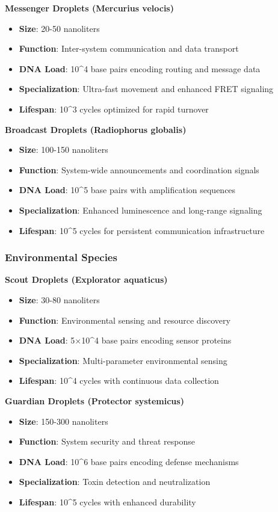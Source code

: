 \documentclass[11pt,a4paper]{article}
\begin{document}
\textbf{Messenger Droplets (Mercurius velocis)}
\begin{itemize}
    \item \textbf{Size}: 20-50 nanoliters
    \item \textbf{Function}: Inter-system communication and data transport
    \item \textbf{DNA Load}: 10\^{}4 base pairs encoding routing and message data
    \item \textbf{Specialization}: Ultra-fast movement and enhanced FRET signaling
    \item \textbf{Lifespan}: 10\^{}3 cycles optimized for rapid turnover
\end{itemize}

\textbf{Broadcast Droplets (Radiophorus globalis)}
\begin{itemize}
    \item \textbf{Size}: 100-150 nanoliters
    \item \textbf{Function}: System-wide announcements and coordination signals
    \item \textbf{DNA Load}: 10\^{}5 base pairs with amplification sequences
    \item \textbf{Specialization}: Enhanced luminescence and long-range signaling
    \item \textbf{Lifespan}: 10\^{}5 cycles for persistent communication infrastructure
\end{itemize}

\subsubsection{Environmental Species}

\textbf{Scout Droplets (Explorator aquaticus)}
\begin{itemize}
    \item \textbf{Size}: 30-80 nanoliters
    \item \textbf{Function}: Environmental sensing and resource discovery
    \item \textbf{DNA Load}: 5×10\^{}4 base pairs encoding sensor proteins
    \item \textbf{Specialization}: Multi-parameter environmental sensing
    \item \textbf{Lifespan}: 10\^{}4 cycles with continuous data collection
\end{itemize}

\textbf{Guardian Droplets (Protector systemicus)}
\begin{itemize}
    \item \textbf{Size}: 150-300 nanoliters
    \item \textbf{Function}: System security and threat response
    \item \textbf{DNA Load}: 10\^{}6 base pairs encoding defense mechanisms
    \item \textbf{Specialization}: Toxin detection and neutralization
    \item \textbf{Lifespan}: 10\^{}5 cycles with enhanced durability
\end{itemize}
\end{document}
